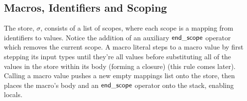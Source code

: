 \documentclass{article}
\begin{document}
\subsection{Macros, Identifiers and Scoping}
The store, $\sigma$, consists of a list of scopes, where each scope is a mapping from identifiers to values. Notice the addition of an auxiliary $\mathsf{end\_scope}$ operator which removes the current scope. A macro literal steps to a macro value by first stepping its input types until they're all values before substituting all of the values in the store within its body (forming a closure) (this rule comes later). Calling a macro value pushes a new empty mappings list onto the store, then places the macro's body and an $\mathsf{end\_scope}$ operator onto the stack, enabling locals.
{
    \centering
    \def \MathparLineskip {\lineskip=0.43cm}
}
\end{document}
